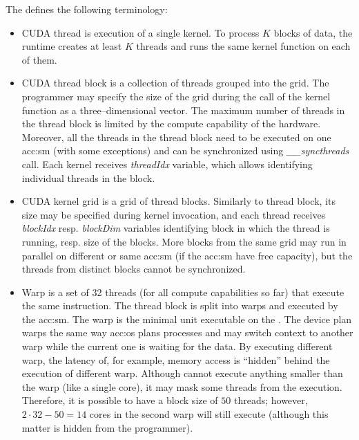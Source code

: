 The \cuda defines the following terminology:
\begin{itemize}
    \item CUDA thread is execution of a single kernel. To process $K$ blocks of data, the runtime creates at least $K$ threads and runs the same kernel function on each of them.
    \item CUDA thread block is a collection of threads grouped into the grid. The programmer may specify the size of the grid during the call of the kernel function as a three--dimensional vector. The maximum number of threads in the thread block is limited by the compute capability of the hardware. Moreover, all the threads in the thread block need to be executed on one \acrshort{acc:sm} (with some exceptions) and can be synchronized using \textit{\_\_syncthreads} call. Each kernel receives \textit{threadIdx} variable, which allows identifying individual threads in the block.
    \item CUDA kernel grid is a grid of thread blocks. Similarly to thread block, its size may be specified during kernel invocation, and each thread receives \textit{blockIdx} resp. \textit{blockDim} variables identifying block in which the thread is running, resp. size of the blocks. More blocks from the same grid may run in parallel on different or same \acrshort{acc:sm} (if the \acrshort{acc:sm} have free capacity), but the threads from distinct blocks cannot be synchronized.
    \item Warp is a set of 32 threads (for all compute capabilities so far) that execute the same instruction. The thread block is split into warps and executed by the \acrshort{acc:sm}. The warp is the minimal unit executable on the \gpu. The device plan warps the same way \acrshort{acc:os} plans processes and may switch context to another warp while the current one is waiting for the data. By executing different warp, the latency of, for example, memory access is \enquote{hidden} behind the execution of different warp. Although \gpu cannot execute anything smaller than the warp (like a single core), it may mask some threads from the execution. Therefore, it is possible to have a block size of $50$ threads; however, $2\cdot32 - 50=14$ cores in the second warp will still execute (although this matter is hidden from the programmer).
\end{itemize}

